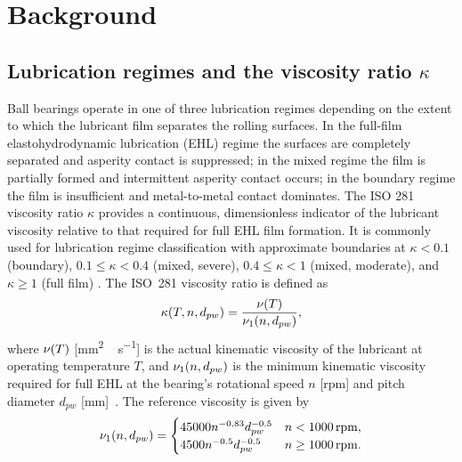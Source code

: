 \section{Background}
\label{sec:background}

\subsection{Lubrication regimes and the viscosity ratio $\kappa$}
\label{subsec:kappa}

Ball bearings operate in one of three lubrication regimes depending on the extent to which the lubricant film separates the rolling surfaces. In the full-film elastohydrodynamic lubrication (EHL) regime the surfaces are completely separated and asperity contact is suppressed; in the mixed regime the film is partially formed and intermittent asperity contact occurs; in the boundary regime the film is insufficient and metal-to-metal contact dominates. The ISO 281 viscosity ratio $\kappa$ provides a continuous, dimensionless indicator of the lubricant viscosity relative to that required for full EHL film formation. It is commonly used for lubrication regime classification with approximate boundaries at $\kappa < 0.1$ (boundary), $0.1 \leq \kappa < 0.4$ (mixed, severe),  $0.4 \leq \kappa < 1$ (mixed, moderate), and $\kappa \geq 1$ (full film) \cite{schaeffler_lubrication_2013,skf_viscosity_ratio}. The ISO~281 viscosity ratio is defined as
\begin{equation}
  \kappa(T, n, d_{pw}) = \frac{\nu(T)}{\nu_1(n, d_{pw})},
  \label{eq:kappa}
\end{equation}
where $\nu(T)$ [\si{mm^2\,s^{-1}}] is the actual kinematic viscosity of the lubricant at operating temperature $T$, and $\nu_1(n, d_{pw})$ is the minimum kinematic viscosity required for full EHL at the bearing's rotational speed $n$ [\si{rpm}] and pitch diameter $d_{pw}$ [\si{mm}]~\cite{iso_281}. The reference viscosity is given by
\begin{equation}
  \nu_1(n, d_{pw}) = \begin{cases}
    45000n^{-0.83}d_{pw}^{-0.5} & n < 1000\,\mathrm{rpm}, \\
    4500n^{-0.5}d_{pw}^{-0.5} & n \geq 1000\,\mathrm{rpm}.
  \end{cases}
  \label{eq:nu1}
\end{equation}
